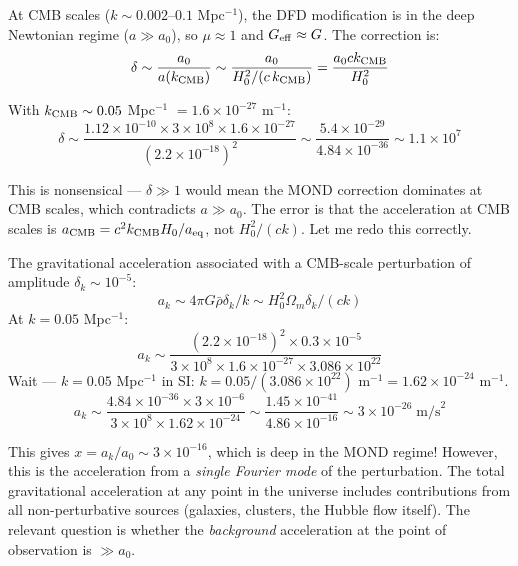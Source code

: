 \documentclass[11pt]{article}
\begin{document}
At CMB scales ($k \sim 0.002$--$0.1$ Mpc$^{-1}$), the DFD modification
is in the deep Newtonian regime ($a \gg a_0$), so $\mu \approx 1$ and
$G_{\rm eff} \approx G$.  The correction is:
\begin{equation}
\delta \sim \frac{a_0}{a(k_{\rm CMB})} \sim \frac{a_0}{H_0^2 / (c\,k_{\rm CMB})}
= \frac{a_0 c k_{\rm CMB}}{H_0^2}
\end{equation}

With $k_{\rm CMB} \sim 0.05$ Mpc$^{-1}$ $= 1.6 \times 10^{-27}$ m$^{-1}$:
\begin{equation}
\delta \sim \frac{1.12 \times 10^{-10} \times 3 \times 10^8 \times 1.6 \times 10^{-27}}
{(2.2 \times 10^{-18})^2}
\sim \frac{5.4 \times 10^{-29}}{4.84 \times 10^{-36}}
\sim 1.1 \times 10^{7}
\end{equation}

This is nonsensical --- $\delta \gg 1$ would mean the MOND correction
dominates at CMB scales, which contradicts $a \gg a_0$.  The error is
that the acceleration at CMB scales is $a_{\rm CMB} = c^2 k_{\rm CMB}
H_0 / a_{\rm eq}$, not $H_0^2/(c k)$.  Let me redo this correctly.

The gravitational acceleration associated with a CMB-scale perturbation
of amplitude $\delta_k \sim 10^{-5}$:
\begin{equation}
a_k \sim 4\pi G \bar\rho \delta_k / k \sim H_0^2 \Omega_m \delta_k / (c k)
\end{equation}
At $k = 0.05$ Mpc$^{-1}$:
\begin{equation}
a_k \sim \frac{(2.2 \times 10^{-18})^2 \times 0.3 \times 10^{-5}}
{3 \times 10^8 \times 1.6 \times 10^{-27} \times 3.086 \times 10^{22}}
\end{equation}
Wait --- $k = 0.05$ Mpc$^{-1}$ in SI: $k = 0.05 / (3.086 \times 10^{22})$
m$^{-1} = 1.62 \times 10^{-24}$ m$^{-1}$.
\begin{equation}
a_k \sim \frac{4.84 \times 10^{-36} \times 3 \times 10^{-6}}
{3 \times 10^8 \times 1.62 \times 10^{-24}}
\sim \frac{1.45 \times 10^{-41}}{4.86 \times 10^{-16}}
\sim 3 \times 10^{-26}\;\text{m/s}^2
\end{equation}

This gives $x = a_k / a_0 \sim 3 \times 10^{-16}$, which is deep in
the MOND regime!  However, this is the acceleration from a \emph{single
Fourier mode} of the perturbation.  The total gravitational acceleration
at any point in the universe includes contributions from all
non-perturbative sources (galaxies, clusters, the Hubble flow itself).
The relevant question is whether the \emph{background} acceleration
at the point of observation is $\gg a_0$.
\end{document}
